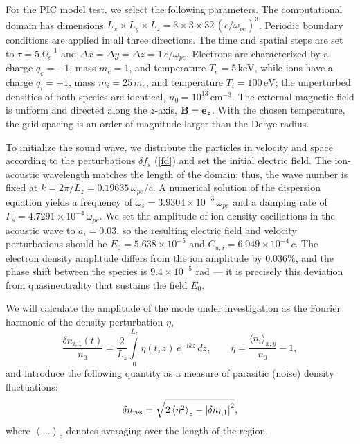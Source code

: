 \documentclass[final,3p]{elsarticle}
\begin{document}
For the PIC model test, we select the following parameters. The computational domain has dimensions $L_x \times L_y \times L_z = 3 \times 3 \times 32 \, (c/\omega_{pe})^3$. Periodic boundary conditions are applied in all three directions. The time and spatial steps are set to $\tau = 5 \, \Omega_e^{-1}$ and $\Delta x = \Delta y = \Delta z = 1 \, c/\omega_{pe}$. Electrons are characterized by a charge $q_e = -1$, mass $m_e = 1$, and temperature $T_e = 5 \, \text{keV}$, while ions have a charge $q_i = +1$, mass $m_i = 25 \, m_e$, and temperature $T_i = 100 \, \text{eV}$; the unperturbed densities of both species are identical, $n_0 = 10^{13} \, \text{cm}^{-3}$. The external magnetic field is uniform and directed along the $z$-axis, ${\bf B} = {\bf e}_z$. With the chosen temperature, the grid spacing is an order of magnitude larger than the Debye radius.

 To initialize the sound wave, we distribute the particles in velocity and space according to the perturbations $\delta f_s$ (\ref{fd}) and set the initial electric field. The ion-acoustic wavelength matches the length of the domain; thus, the wave number is fixed at $k=2\pi/L_z=0.19635\,\omega_{pe}/c$. A numerical solution of the dispersion equation yields a frequency of $\omega_s=3.9304\times10^{-3}\,\omega_{pe}$ and a damping rate of $\Gamma_s=4.7291\times10^{-4}\,\omega_{pe}$. We set the amplitude of ion density oscillations in the acoustic wave to $a_i=0.03$, so the resulting electric field and velocity perturbations should be $E_0=5.638\times10^{-5}$ and $C_{u,i}=6.049\times10^{-4}\,c$. The electron density amplitude differs from the ion amplitude by $0.036\%$, and the phase shift between the species is $9.4\times10^{-5}$ rad --- it is precisely this deviation from quasineutrality that sustains the field $E_0$.

We will calculate the amplitude of the mode under investigation as the Fourier harmonic of the density perturbation $\eta$,
 \begin{equation}\label{dnc_def}
    \frac{\delta n_{i,1}(t)}{n_0}=\frac{2}{L_z}\int\limits_0^{L_z}
    \eta(t,z)\,e^{-ikz}\,dz,
    \qquad \eta=\frac{\langle n_i\rangle_{x,y}}{n_0}-1,
\end{equation}
and introduce the following quantity as a measure of parasitic (noise) density fluctuations:
\begin{equation}
	\delta n_{\rm res}=\sqrt{2\left\langle \eta^2\right\rangle_z-\left|\delta n_{i,1}\right|^2},
\end{equation}
where $\left\langle ...\right\rangle_z$ denotes averaging over the length of the region.
\end{document}

